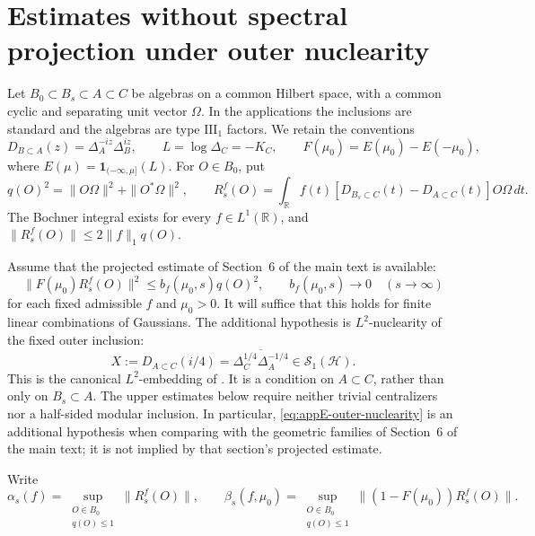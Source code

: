 \documentclass[a4paper,11pt]{article}
\theoremstyle{definition}
\begin{document}
\section{Estimates without spectral projection under outer nuclearity}
\label{app:uncut-nuclearity}

Let $B_0\subset B_s\subset A\subset C$ be algebras on a common Hilbert space, with a common cyclic and separating unit vector $\Omega$. In the applications the inclusions are standard and the algebras are type $\mathrm{III}_1$ factors. We retain the conventions
\begin{equation}
 D_{B\subset A}(z)=\Delta_A^{-iz}\Delta_B^{iz},\qquad
 L=\log\Delta_C=-K_C,\qquad
 F(\mu_0)=E(\mu_0)-E(-\mu_0),
 \label{eq:appE-conventions}
\end{equation}
where $E(\mu)=\mathbf1_{(-\infty,\mu]}(L)$. For $O\in B_0$, put
\begin{equation}
 q(O)^2=\|O\Omega\|^2+\|O^*\Omega\|^2,\qquad
 R_s^f(O)=\int_{\mathbb R}f(t)
 [D_{B_s\subset C}(t)-D_{A\subset C}(t)]O\Omega\,dt.
 \label{eq:appE-error}
\end{equation}
The Bochner integral exists for every $f\in L^1(\mathbb R)$, and
$\|R_s^f(O)\|\le2\|f\|_1q(O)$.

Assume that the projected estimate of Section~6 of the main text is available:
\begin{equation}
 \|F(\mu_0)R_s^f(O)\|^2
 \le b_f(\mu_0,s)q(O)^2,\qquad
 b_f(\mu_0,s)\longrightarrow0
 \quad(s\to\infty)
 \label{eq:appE-projected}
\end{equation}
for each fixed admissible $f$ and $\mu_0>0$. It will suffice that this holds for finite linear combinations of Gaussians. The additional hypothesis is $L^2$-nuclearity of the fixed outer inclusion:
\begin{equation}
 X:=D_{A\subset C}(i/4)
 =\overline{\Delta_C^{1/4}\Delta_A^{-1/4}}
 \in\mathcal S_1(\mathcal H).
 \label{eq:appE-outer-nuclearity}
\end{equation}
This is the canonical $L^2$-embedding of \cite[Section~5]{BDL2007}. It is a condition on $A\subset C$, rather than only on $B_s\subset A$. The upper estimates below require neither trivial centralizers nor a half-sided modular inclusion. In particular, \eqref{eq:appE-outer-nuclearity} is an additional hypothesis when comparing with the geometric families of Section~6 of the main text; it is not implied by that section's projected estimate.

Write
\begin{equation}
 \alpha_s(f)=\sup_{\substack{O\in B_0\\q(O)\le1}}\|R_s^f(O)\|,
 \qquad
 \beta_s(f,\mu_0)=\sup_{\substack{O\in B_0\\q(O)\le1}}
 \|(1-F(\mu_0))R_s^f(O)\|.
 \label{eq:appE-uniform-quantities}
\end{equation}
\end{document}
